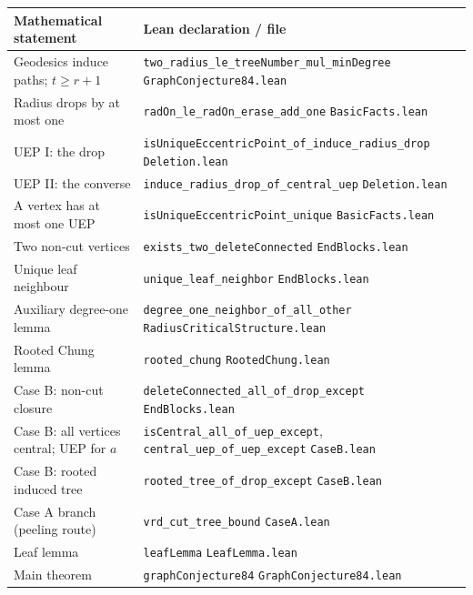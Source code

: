 \documentclass[11pt]{article}
\theoremstyle{definition}
\begin{document}
\begin{center}
\small
\begin{tabular}{@{}P{5.6cm}P{9.0cm}@{}}
\toprule
Mathematical statement & Lean declaration / file \\
\midrule
Geodesics induce paths; $t\ge r+1$ &
\texttt{two\_radius\_le\_treeNumber\_mul\_minDegree}\newline
\texttt{GraphConjecture84.lean} \\
Radius drops by at most one &
\texttt{radOn\_le\_radOn\_erase\_add\_one}\newline
\texttt{BasicFacts.lean} \\
UEP I: the drop &
\texttt{isUniqueEccentricPoint\_of\_induce\_radius\_drop}\newline
\texttt{Deletion.lean} \\
UEP II: the converse &
\texttt{induce\_radius\_drop\_of\_central\_uep}\newline
\texttt{Deletion.lean} \\
A vertex has at most one UEP &
\texttt{isUniqueEccentricPoint\_unique}\newline
\texttt{BasicFacts.lean} \\
Two non-cut vertices &
\texttt{exists\_two\_deleteConnected}\newline
\texttt{EndBlocks.lean} \\
Unique leaf neighbour &
\texttt{unique\_leaf\_neighbor}\newline
\texttt{EndBlocks.lean} \\
Auxiliary degree-one lemma &
\texttt{degree\_one\_neighbor\_of\_all\_other}\newline
\texttt{RadiusCriticalStructure.lean} \\
Rooted Chung lemma &
\texttt{rooted\_chung}\newline
\texttt{RootedChung.lean} \\
Case B: non-cut closure &
\texttt{deleteConnected\_all\_of\_drop\_except}\newline
\texttt{EndBlocks.lean} \\
Case B: all vertices central; UEP for $a$ &
\texttt{isCentral\_all\_of\_uep\_except},\newline
\texttt{central\_uep\_of\_uep\_except}\newline
\texttt{CaseB.lean} \\
Case B: rooted induced tree &
\texttt{rooted\_tree\_of\_drop\_except}\newline
\texttt{CaseB.lean} \\
Case A branch (peeling route) &
\texttt{vrd\_cut\_tree\_bound}\newline
\texttt{CaseA.lean} \\
Leaf lemma &
\texttt{leafLemma}\newline
\texttt{LeafLemma.lean} \\
Main theorem &
\texttt{graphConjecture84}\newline
\texttt{GraphConjecture84.lean} \\
\bottomrule
\end{tabular}
\end{center}
\end{document}
